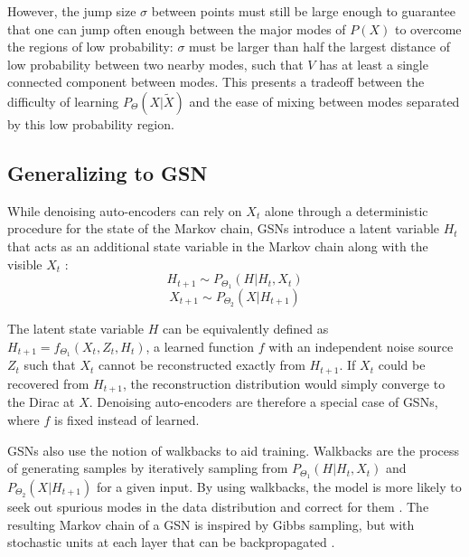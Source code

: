 However, the jump size \(\sigma\) between points must still be large enough to guarantee that one can jump often enough between the major modes of \(P(X)\) to overcome the regions of low probability: \(\sigma\) must be larger than half the largest distance of low probability between two nearby modes, such that \(V\) has at least a single connected component between modes. This presents a tradeoff between the difficulty of learning \(P_{\Theta}(X|\widetilde{X})\) and the ease of mixing between modes separated by this low probability region.


\subsection{Generalizing to GSN}

While denoising auto-encoders can rely on \(X_t\) alone through a deterministic procedure for the state of the Markov chain, GSNs introduce a latent variable \(H_t\) that acts as an additional state variable in the Markov chain along with the visible \(X_t\) \cite{gsn}:
\begin{equation}
	H_{t+1} \sim P_{\Theta_1}(H|H_t, X_t)
\end{equation}
\begin{equation}
	X_{t+1} \sim  P_{\Theta_2}(X|H_{t+1})
\end{equation}


The latent state variable \(H\) can be equivalently defined as \(H_{t+1} = f_{\Theta_1}(X_t,Z_t,H_t)\), a learned function \(f\) with an independent noise source \(Z_t\) such that \(X_t\) cannot be reconstructed exactly from \(H_{t+1}\). If \(X_t\) could be recovered from \(H_{t+1}\), the reconstruction distribution would simply converge to the Dirac at \(X\). Denoising auto-encoders are therefore a special case of GSNs, where \(f\) is fixed instead of learned.

GSNs also use the notion of walkbacks to aid training. Walkbacks are the process of generating samples by iteratively sampling from \(P_{\Theta_1}(H|H_t, X_t)\) and \(P_{\Theta_2}(X|H_{t+1})\) for a given input. By using walkbacks, the model is more likely to seek out spurious modes in the data distribution and correct for them \cite{bengio13a}. The resulting Markov chain of a GSN is inspired by Gibbs sampling, but with stochastic units at each layer that can be backpropagated \cite{rezende14}.

